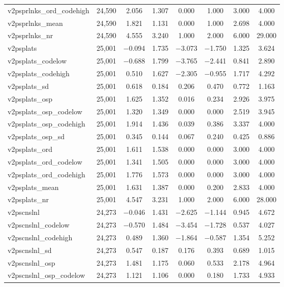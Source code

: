 \begin{table}[!htbp]
\begin{tabular}{@{\extracolsep{5pt}}lccccccc}
v2psprlnks\_ord\_codehigh & 24,590 & 2.056 & 1.307 & 0.000 & 1.000 & 3.000 & 4.000 \\ 
v2psprlnks\_mean & 24,590 & 1.821 & 1.131 & 0.000 & 1.000 & 2.698 & 4.000 \\ 
v2psprlnks\_nr & 24,590 & 4.555 & 3.240 & 1.000 & 2.000 & 6.000 & 29.000 \\ 
v2psplats & 25,001 & $-$0.094 & 1.735 & $-$3.073 & $-$1.750 & 1.325 & 3.624 \\ 
v2psplats\_codelow & 25,001 & $-$0.688 & 1.799 & $-$3.765 & $-$2.441 & 0.841 & 2.890 \\ 
v2psplats\_codehigh & 25,001 & 0.510 & 1.627 & $-$2.305 & $-$0.955 & 1.717 & 4.292 \\ 
v2psplats\_sd & 25,001 & 0.618 & 0.184 & 0.206 & 0.470 & 0.772 & 1.163 \\ 
v2psplats\_osp & 25,001 & 1.625 & 1.352 & 0.016 & 0.234 & 2.926 & 3.975 \\ 
v2psplats\_osp\_codelow & 25,001 & 1.320 & 1.349 & 0.000 & 0.000 & 2.519 & 3.945 \\ 
v2psplats\_osp\_codehigh & 25,001 & 1.914 & 1.436 & 0.039 & 0.386 & 3.337 & 4.000 \\ 
v2psplats\_osp\_sd & 25,001 & 0.345 & 0.144 & 0.067 & 0.240 & 0.425 & 0.886 \\ 
v2psplats\_ord & 25,001 & 1.611 & 1.538 & 0.000 & 0.000 & 3.000 & 4.000 \\ 
v2psplats\_ord\_codelow & 25,001 & 1.341 & 1.505 & 0.000 & 0.000 & 3.000 & 4.000 \\ 
v2psplats\_ord\_codehigh & 25,001 & 1.776 & 1.573 & 0.000 & 0.000 & 3.000 & 4.000 \\ 
v2psplats\_mean & 25,001 & 1.631 & 1.387 & 0.000 & 0.200 & 2.833 & 4.000 \\ 
v2psplats\_nr & 25,001 & 4.547 & 3.231 & 1.000 & 2.000 & 6.000 & 28.000 \\ 
v2pscnslnl & 24,273 & $-$0.046 & 1.431 & $-$2.625 & $-$1.144 & 0.945 & 4.672 \\ 
v2pscnslnl\_codelow & 24,273 & $-$0.570 & 1.484 & $-$3.454 & $-$1.728 & 0.537 & 4.027 \\ 
v2pscnslnl\_codehigh & 24,273 & 0.489 & 1.360 & $-$1.864 & $-$0.587 & 1.354 & 5.252 \\ 
v2pscnslnl\_sd & 24,273 & 0.547 & 0.187 & 0.176 & 0.393 & 0.689 & 1.015 \\ 
v2pscnslnl\_osp & 24,273 & 1.481 & 1.175 & 0.060 & 0.533 & 2.178 & 4.964 \\ 
v2pscnslnl\_osp\_codelow & 24,273 & 1.121 & 1.106 & 0.000 & 0.180 & 1.733 & 4.933 \\ 

\end{tabular}
\end{table}
